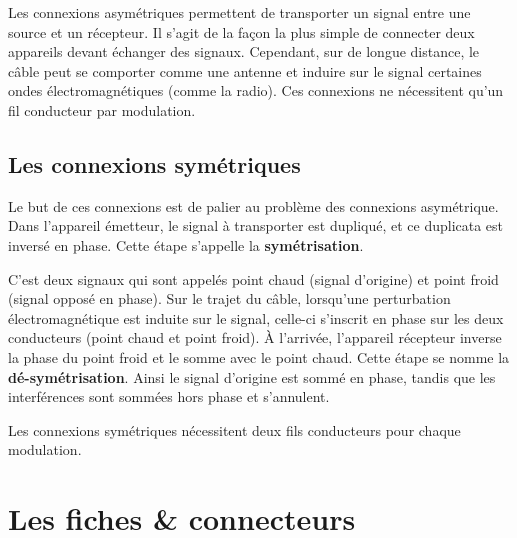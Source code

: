 \documentclass[
  letterpaper,
  DIV=11,
  numbers=noendperiod]{scrreprt}
\begin{document}
Les connexions asymétriques permettent de transporter un signal entre
une source et un récepteur. Il s'agit de la façon la plus simple de
connecter deux appareils devant échanger des signaux. Cependant, sur de
longue distance, le câble peut se comporter comme une antenne et induire
sur le signal certaines ondes électromagnétiques (comme la radio). Ces
connexions ne nécessitent qu'un fil conducteur par modulation.

\hypertarget{les-connexions-symuxe9triques}{%
\subsection{Les connexions
symétriques}\label{les-connexions-symuxe9triques}}

Le but de ces connexions est de palier au problème des connexions
asymétrique. Dans l'appareil émetteur, le signal à transporter est
dupliqué, et ce duplicata est inversé en phase. Cette étape s'appelle la
\textbf{symétrisation}.

C'est deux signaux qui sont appelés point chaud (signal d'origine) et
point froid (signal opposé en phase). Sur le trajet du câble, lorsqu'une
perturbation électromagnétique est induite sur le signal, celle-ci
s'inscrit en phase sur les deux conducteurs (point chaud et point
froid). À l'arrivée, l'appareil récepteur inverse la phase du point
froid et le somme avec le point chaud. Cette étape se nomme la
\textbf{dé-symétrisation}. Ainsi le signal d'origine est sommé en phase,
tandis que les interférences sont sommées hors phase et s'annulent.

Les connexions symétriques nécessitent deux fils conducteurs pour chaque
modulation.

\hypertarget{les-fiches-connecteurs}{%
\section{Les fiches \& connecteurs}\label{les-fiches-connecteurs}}
\end{document}
